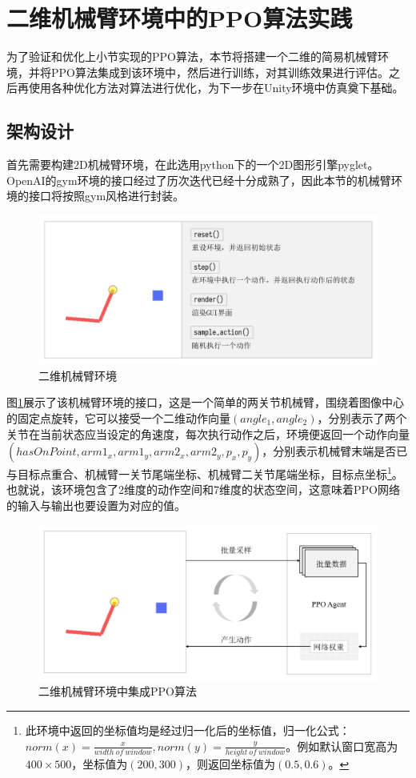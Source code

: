 \documentclass[bachelor]{thesis-uestc}
\begin{document}
	\section{二维机械臂环境中的PPO算法实践}
	为了验证和优化上小节实现的PPO算法，本节将搭建一个二维的简易机械臂环境，并将PPO算法集成到该环境中，然后进行训练，对其训练效果进行评估。之后再使用各种优化方法对算法进行优化，为下一步在Unity环境中仿真奠下基础。
	\subsection{架构设计}
	首先需要构建2D机械臂环境，在此选用python下的一个2D图形引擎pyglet。OpenAI的gym环境的接口经过了历次迭代已经十分成熟了，因此本节的机械臂环境的接口将按照gym风格进行封装。
	\begin{figure}[h]
		\centering
		\includegraphics[width=14cm]{./pic/2darm.jpg}
		\caption{二维机械臂环境}
		\label{2darm}
	\end{figure}
	图\ref{2darm}展示了该机械臂环境的接口，这是一个简单的两关节机械臂，围绕着图像中心的固定点旋转，它可以接受一个二维动作向量$(angle_1,angle_2)$，分别表示了两个关节在当前状态应当设定的角速度，每次执行动作之后，环境便返回一个动作向量$(hasOnPoint,arm1_x,arm1_y,arm2_x,arm2_y,p_x,p_y)$，分别表示机械臂末端是否已与目标点重合、机械臂一关节尾端坐标、机械臂二关节尾端坐标，目标点坐标\footnote{此环境中返回的坐标值均是经过归一化后的坐标值，归一化公式：$norm(x)=\frac{x}{width\ of\ window}, norm(y)=\frac{y}{height\ of\ window}$。例如默认窗口宽高为$400\times500$，坐标值为$(200,300)$，则返回坐标值为$(0.5,0.6)$。}。也就说，该环境包含了2维度的动作空间和7维度的状态空间，这意味着PPO网络的输入与输出也要设置为对应的值。
	
	\begin{figure}[h]
		\centering
		\includegraphics[width=14cm]{./pic/2darm-ppo.jpg}
		\caption{二维机械臂环境中集成PPO算法}
		\label{2darm-ppo}
	\end{figure}
\end{document}
